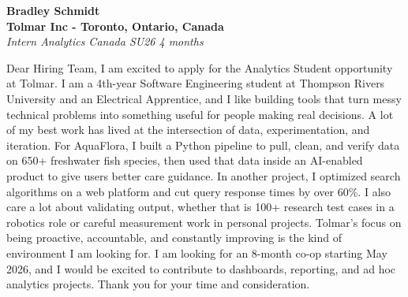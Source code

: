 \documentclass[11pt]{article}
\begin{document}
\textbf{Bradley Schmidt}\\
\vspace{0.5em}
\textbf{Tolmar Inc - Toronto, Ontario, Canada}\\
\textit{Intern Analytics Canada SU26 4 months}

Dear Hiring Team, I am excited to apply for the Analytics Student opportunity at Tolmar. I am a 4th-year Software Engineering student at Thompson Rivers University and an Electrical Apprentice, and I like building tools that turn messy technical problems into something useful for people making real decisions. A lot of my best work has lived at the intersection of data, experimentation, and iteration. For AquaFlora, I built a Python pipeline to pull, clean, and verify data on 650+ freshwater fish species, then used that data inside an AI-enabled product to give users better care guidance. In another project, I optimized search algorithms on a web platform and cut query response times by over 60\%. I also care a lot about validating output, whether that is 100+ research test cases in a robotics role or careful measurement work in personal projects. Tolmar’s focus on being proactive, accountable, and constantly improving is the kind of environment I am looking for. I am looking for an 8-month co-op starting May 2026, and I would be excited to contribute to dashboards, reporting, and ad hoc analytics projects. Thank you for your time and consideration.
\end{document}
